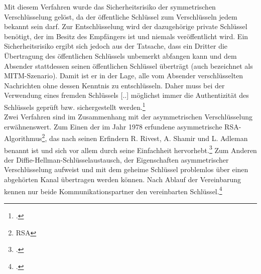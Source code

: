 \documentclass  [paper=a4,
				fontsize=12pt,
				listof=totoc,
				bibliography=totoc
				]{scrreprt}
\begin{document}
				Mit diesem Verfahren wurde das Sicherheitsrisiko der symmetrischen Verschlüsselung gelöst, da der öffentliche Schlüssel zum Verschlüsseln jedem bekannt sein darf. Zur Entschlüsselung wird der dazugehörige private Schlüssel benötigt, der im Besitz des Empfängers ist und niemals veröffentlicht wird.
				Ein Sicherheitsrisiko ergibt sich jedoch aus der Tatsache, dass ein Dritter die Übertragung des öffentlichen Schlüssels unbemerkt abfangen kann und dem Absender stattdessen seinen öffentlichen Schlüssel überträgt (auch bezeichnet als \ac{MITM}-Szenario). Damit ist er in der Lage, alle vom Absender verschlüsselten Nachrichten ohne dessen Kenntnis zu entschlüsseln. Daher muss \glqq bei der Verwendung eines fremden Schlüssels [..] möglichst immer die Authentizität des Schlüssels geprüft bzw. sichergestellt werden.\grqq\footcite[][S. 90]{Ertel2012}\medskip\\
				
				Zwei Verfahren sind im Zusammenhang mit der asymmetrischen Verschlüsselung erwähnenswert. Zum Einen der im Jahr 1978 erfundene asymmetrische RSA-Algorithmus\footnote{\ac{RSA}}, das nach seinen Erfindern R. Rivest, A. Shamir und L. Adleman benannt ist und sich vor allem durch seine Einfachheit hervorhebt.\footcite[Vgl.][S. 79]{Ertel2012} Zum Anderen der Diffie-Hellman-Schlüsselaustausch, der Eigenschaften asymmetrischer Verschlüsselung aufweist und mit dem geheime Schlüssel problemlos über einen abgehörten Kanal übertragen werden können. Nach Ablauf der Vereinbarung kennen nur beide Kommunikationspartner den vereinbarten Schlüssel.\footcite[Vgl.][S. 129]{Stephan2011}
\end{document}
